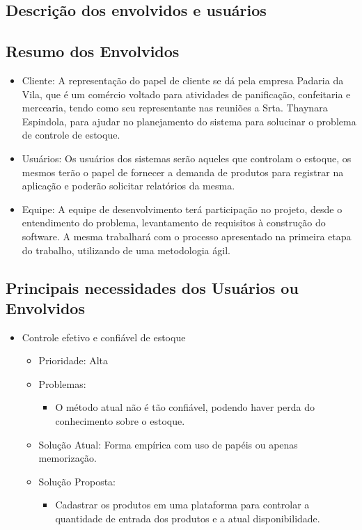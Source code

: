 \begin{appendices}
\section{Descrição dos envolvidos e usuários}

\subsection{Resumo dos Envolvidos}

\begin{itemize}

\item Cliente: A representação do papel de cliente se dá pela empresa Padaria da Vila, que é um comércio voltado para atividades de panificação, confeitaria e mercearia, tendo como seu representante nas reuniões a Srta. Thaynara Espindola, para ajudar no planejamento do sistema para solucinar o problema de controle de estoque.

\item Usuários: Os usuários dos sistemas serão aqueles que controlam o estoque, os mesmos terão o papel de fornecer a demanda de produtos para registrar na aplicação e poderão solicitar relatórios da mesma.

\item Equipe: A equipe de desenvolvimento terá participação no projeto, desde o entendimento do problema, levantamento de requisitos à construção do software. A mesma trabalhará com o processo apresentado na primeira etapa do trabalho, utilizando de uma metodologia ágil.

\end{itemize}

\subsection{Principais necessidades dos Usuários ou Envolvidos}

\begin{itemize}

\item Controle efetivo e confiável de estoque
	
	\begin{itemize}
		\item Prioridade: Alta
		\item Problemas:
			\begin{itemize}
				\item O método atual não é tão confiável, podendo haver perda do conhecimento sobre o estoque.
			\end{itemize}
		\item Solução Atual: Forma empírica com uso de papéis ou apenas memorização.
		\item Solução Proposta:
			\begin{itemize}
				\item Cadastrar os produtos em uma plataforma para controlar a quantidade de entrada dos produtos e a atual disponibilidade.
			\end{itemize}
	\end{itemize}


\end{itemize}
\end{appendices}
